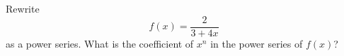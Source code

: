 Rewrite 
\[
f(x) = \frac{2}{3 + 4x}
\]
as a power series.
What is the coefficient of $x^n$ in the power series of $f(x)$?
